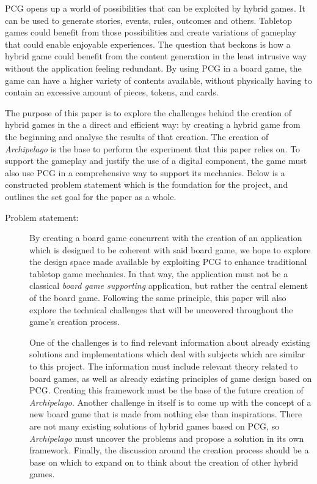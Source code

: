 PCG opens up a world of possibilities that can be exploited by hybrid games. It can be used to generate stories, events, rules, outcomes and others. Tabletop games could benefit from those possibilities and create variations of gameplay that could enable enjoyable experiences. The question that beckons is how a hybrid game could benefit from the content generation in the least intrusive way without the application feeling redundant. By using PCG in a board game, the game can have a higher variety of contents available, without physically having to contain an excessive amount of pieces, tokens, and cards. 

The purpose of this paper is to explore the challenges behind the creation of hybrid games in the a direct and efficient way: by creating a hybrid game from the beginning and analyse the results of that creation. The creation of \textit{Archipelago} is the base to perform the experiment that this paper relies on. To support the gameplay and justify the use of a digital component, the game must also use PCG in a comprehensive way to support its mechanics. Below is a constructed problem statement which is the foundation for the project, and outlines the set goal for the paper as a whole.

\begin{description}
\item[Problem statement:]

By creating a board game concurrent with the creation of an application which is designed to be coherent with said board game, we hope to explore the design space made available by exploiting PCG to enhance traditional tabletop game mechanics. In that way, the application must not be a classical \textit{board game supporting} application, but rather the central element of the board game. Following the same principle, this paper will also explore the technical challenges that will be uncovered throughout the game's creation process. 

One of the challenges is to find relevant information about already existing solutions and implementations which deal with subjects which are similar to this project. The information must include relevant theory related to board games, as well as already existing principles of game design based on PCG. Creating this framework must be the base of the future creation of \textit{Archipelago}. Another challenge in itself is to come up with the concept of a new board game that is made from nothing else than inspirations. There are not many existing solutions of hybrid games based on PCG, so \textit{Archipelago} must uncover the problems and propose a solution in its own framework. Finally, the discussion around the creation process should be a base on which to expand on to think about the creation of other hybrid games. 
\end{description}


